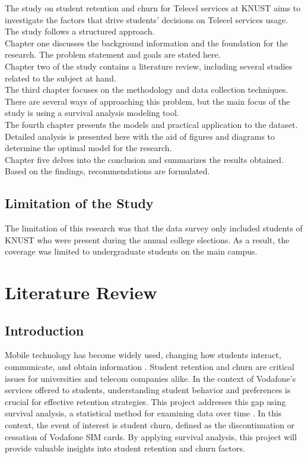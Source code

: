 \documentclass[doublespacing]{report} %
\begin{document}
The study on student retention and churn for Telecel services at KNUST aims to investigate the factors that drive students' decisions on Telecel services usage. The study follows a structured approach.
\\Chapter one discusses the background information and the foundation for the research. The problem statement and goals are stated here.
\\Chapter two of the study contains a literature review, including several studies related to the subject at hand.
\\The third chapter focuses on the methodology and data collection techniques. There are several ways of approaching this problem, but the main focus of the study is using a survival analysis modeling tool.
\\The fourth chapter presents the models and practical application to the dataset. Detailed analysis is presented here with the aid of figures and diagrams to determine the optimal model for the research.
\\Chapter five delves into the conclusion and summarizes the results obtained. Based on the findings, recommendations are formulated.

\section{Limitation of the Study}

The limitation of this research was that the data survey only included students of KNUST who were present during the annual college elections. As a result, the coverage was limited to undergraduate students on the main campus.

\newpage
\chapter{Literature Review}


\section{Introduction}
Mobile technology has become widely used, changing how students interact, communicate, and obtain information \citeauthor{Alqatani2020}. Student retention and churn are critical issues for universities and telecom companies alike. In the context of Vodafone's services offered to students, understanding student behavior and preferences is crucial for effective retention strategies. This project addresses this gap using survival analysis, a statistical method for examining data over time \citeauthor{BoxSteffensmeier2020}. In this context, the event of interest is student churn, defined as the discontinuation or cessation of Vodafone SIM cards. By applying survival analysis, this project will provide valuable insights into student retention and churn factors.
\end{document}
